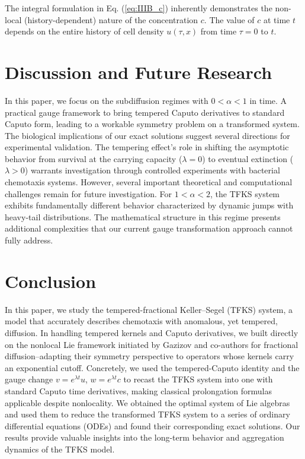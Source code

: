 \documentclass{article}
\begin{document}
\par 
The integral formulation in Eq. (\ref{eq:IIIB_c}) inherently demonstrates the non-local (history-dependent) nature of the concentration $c$. The value of $c$ at time $t$ depends on the entire history of cell density $u(\tau,x)$ from time $\tau=0$ to $t$. 
\section{Discussion and Future Research}
In this paper, we focus on the subdiffusion regimes with $0<\alpha< 1$ in time. A practical gauge framework to bring tempered Caputo derivatives to standard Caputo form, leading to a workable symmetry problem on a transformed system. The biological implications of our exact solutions suggest several directions for experimental validation. The tempering effect's role in shifting the asymptotic behavior from survival at the carrying capacity ($\lambda=0$) to eventual extinction ($\lambda>0$) warrants investigation through controlled experiments with bacterial chemotaxis systems.  However, several important theoretical and computational challenges remain for future investigation. For $1<\alpha<2$, the TFKS system exhibits fundamentally different behavior characterized by dynamic jumps with heavy-tail distributions. The mathematical structure in this regime presents additional complexities that our current gauge transformation approach cannot fully address. 
\par 

\section{Conclusion}
In this paper, we study the tempered-fractional Keller--Segel (TFKS) system, a model that accurately describes chemotaxis with anomalous, yet tempered, diffusion. In handling tempered kernels and Caputo derivatives, we built directly on the nonlocal Lie framework initiated by Gazizov and co-authors for fractional diffusion--adapting their symmetry perspective to operators whose kernels carry an exponential cutoff. Concretely, we used the tempered-Caputo identity and the gauge change $v=e^{\lambda t}u$, $w=e^{\lambda t}c$ to recast the TFKS system into one with standard Caputo time derivatives, making classical prolongation formulas applicable despite nonlocality. We obtained the optimal system of Lie algebras and used them to reduce the transformed TFKS system to a series of ordinary differential equations (ODEs) and found their corresponding exact solutions. Our results provide valuable insights into the long-term behavior and aggregation dynamics of the TFKS model.
\end{document}
